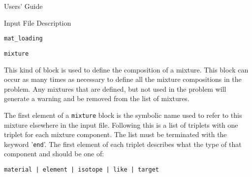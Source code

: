 \begin{chapter}{Users' Guide\label{app:user.guide}}
\begin{section}{Input File Description\label{app:user.input}}
\begin{subsection}{\texttt{mat\_loading}\label{app:user.input.loading}}
    \end{subsection}
 

    \begin{subsection}{\texttt{mixture}\label{app:user.input.mix}}
      
      This kind of block is used to define the composition of a
      mixture.  This block can occur as many times as necessary to
      define all the mixture compositions in the problem.  Any
      mixtures that are defined, but not used in the problem will
      generate a warning and be removed from the list of mixtures.
      
      The first element of a \texttt{mixture} block is the symbolic
      name used to refer to this mixture elsewhere in the input file.
      Following this is a list of triplets with one triplet for each
      mixture component.  The list must be terminated with the keyword
      '\texttt{end}'.  The first element of each triplet describes
      what the type of that component and should be one of:
      \begin{center}
        \texttt{material | element | isotope | like | target}
      \end{center}
      

\end{subsection}
\end{section}
\end{chapter}
